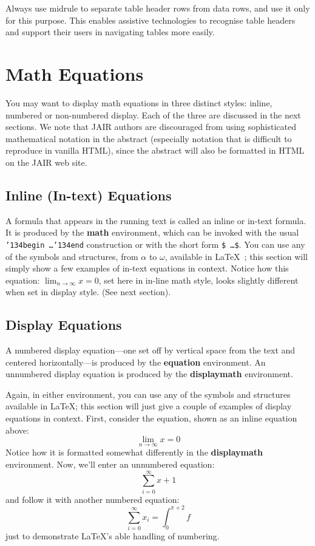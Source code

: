 \documentclass[]{jair}
\begin{document}
Always use midrule to separate table header rows from data rows, and
use it only for this purpose. This enables assistive technologies to
recognise table headers and support their users in navigating tables
more easily.

\section{Math Equations}
You may want to display math equations in three distinct styles:
inline, numbered or non-numbered display.  Each of the three are
discussed in the next sections. We note that JAIR authors are discouraged from using sophisticated mathematical notation in the abstract (especially notation that is difficult to reproduce in vanilla HTML), since the abstract will also be formatted in HTML on the JAIR web site. 

\subsection{Inline (In-text) Equations}
A formula that appears in the running text is called an inline or
in-text formula.  It is produced by the \textbf{math} environment,
which can be invoked with the usual
\texttt{{\char'134}begin\,\ldots{\char'134}end} construction or with
the short form \texttt{\$\,\ldots\$}. You can use any of the symbols
and structures, from $\alpha$ to $\omega$, available in
\LaTeX~\cite{Lamport:LaTeX}; this section will simply show a few
examples of in-text equations in context. Notice how this equation:
\begin{math}
  \lim_{n\rightarrow \infty}x=0
\end{math},
set here in in-line math style, looks slightly different when
set in display style.  (See next section).

\subsection{Display Equations}
A numbered display equation---one set off by vertical space from the
text and centered horizontally---is produced by the \textbf{equation}
environment. An unnumbered display equation is produced by the
\textbf{displaymath} environment.

Again, in either environment, you can use any of the symbols and
structures available in \LaTeX\@; this section will just give a couple
of examples of display equations in context.  First, consider the
equation, shown as an inline equation above:
\begin{equation}
  \lim_{n\rightarrow \infty}x=0
\end{equation}
Notice how it is formatted somewhat differently in
the \textbf{displaymath}
environment.  Now, we'll enter an unnumbered equation:
\begin{displaymath}
  \sum_{i=0}^{\infty} x + 1
\end{displaymath}
and follow it with another numbered equation:
\begin{equation}
  \sum_{i=0}^{\infty}x_i=\int_{0}^{\pi+2} f
\end{equation}
just to demonstrate \LaTeX's able handling of numbering.
\end{document}

